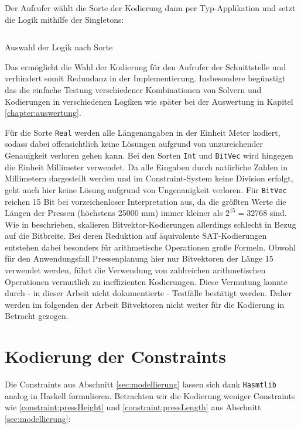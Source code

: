 Der Aufrufer wählt die Sorte der Kodierung dann per Typ-Applikation und setzt die Logik mithilfe der Singletons:

\begin{listing}[H]
    \inputminted[linenos=true]{haskell}{Code/Implementierung/SortPolySetLogic.hs}
    \caption{Auswahl der Logik nach Sorte}
    \label{listing:implsortpolylogic}
\end{listing}

Das ermöglicht die Wahl der Kodierung für den Aufrufer der Schnittstelle und verhindert somit Redundanz in der Implementierung.
Insbesondere begünstigt das die einfache Testung verschiedener Kombinationen von Solvern und Kodierungen in verschiedenen Logiken wie später bei der Auswertung in Kapitel \ref{chapter:auswertung}.

Für die Sorte \texttt{Real} werden alle Längenangaben in der Einheit Meter kodiert, sodass dabei offensichtlich keine Lösungen aufgrund von unzureichender Genauigkeit verloren gehen kann.
Bei den Sorten \texttt{Int} und \texttt{BitVec} wird hingegen die Einheit Millimeter verwendet.
Da alle Eingaben durch natürliche Zahlen in Millimetern dargestellt werden und im Constraint-System keine Division erfolgt, geht auch hier keine Lösung aufgrund von Ungenauigkeit verloren.
Für \texttt{BitVec} reichen 15 Bit bei vorzeichenloser Interpretation aus, da die größten Werte die Längen der Pressen (höchstens 25000 mm) immer kleiner als $2^{15} = 32768$ sind.
Wie in \cite{bitblasting} beschrieben, skalieren Bitvektor-Kodierungen allerdings schlecht in Bezug auf die Bitbreite.
Bei deren Reduktion auf äquivalente SAT-Kodierungen entstehen dabei besonders für arithmetische Operationen große Formeln.
Obwohl für den Anwendungsfall Pressenplanung hier nur Bitvektoren der Länge 15 verwendet werden, führt die Verwendung von zahlreichen arithmetischen Operationen
vermutlich zu ineffizienten Kodierungen.
Diese Vermutung konnte durch - in dieser Arbeit nicht dokumentierte - Testfälle bestätigt werden.
Daher werden im folgenden der Arbeit Bitvektoren nicht weiter für die Kodierung in Betracht gezogen.

\section{Kodierung der Constraints}
\label{sec:kodierungconstraints}
Die Constraints aus Abschnitt \ref{sec:modellierung} lassen sich dank \texttt{Hasmtlib} analog in Haskell formulieren.
Betrachten wir die Kodierung weniger Constraints wie \ref{constraint:pressHeight} und \ref{constraint:pressLength} aus Abschnitt \ref{sec:modellierung}:

